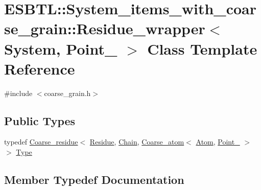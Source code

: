 \hypertarget{classESBTL_1_1System__items__with__coarse__grain_1_1Residue__wrapper}{}\section{E\+S\+B\+TL\+:\+:System\+\_\+items\+\_\+with\+\_\+coarse\+\_\+grain\+:\+:Residue\+\_\+wrapper$<$ System, Point\+\_ $>$ Class Template Reference}
\label{classESBTL_1_1System__items__with__coarse__grain_1_1Residue__wrapper}


{\ttfamily \#include $<$coarse\+\_\+grain.\+h$>$}

\subsection*{Public Types}
\begin{DoxyCompactItemize}
\item 
typedef \hyperlink{classESBTL_1_1Coarse__residue}{Coarse\+\_\+residue}$<$ \hyperlink{classESBTL_1_1Molecular__residue}{Residue}, \hyperlink{classESBTL_1_1Molecular__chain}{Chain}, \hyperlink{classESBTL_1_1Coarse__atom}{Coarse\+\_\+atom}$<$ \hyperlink{classESBTL_1_1Molecular__atom}{Atom}, \hyperlink{classESBTL_1_1Point__3}{Point\+\_} $>$ $>$ \hyperlink{classESBTL_1_1System__items__with__coarse__grain_1_1Residue__wrapper_a8aa82ba7375c40e7d0ec250584bb4c8b}{Type}
\end{DoxyCompactItemize}


\subsection{Member Typedef Documentation}
\mbox{\label{classESBTL_1_1System__items__with__coarse__grain_1_1Residue__wrapper_a8aa82ba7375c40e7d0ec250584bb4c8b}} 
